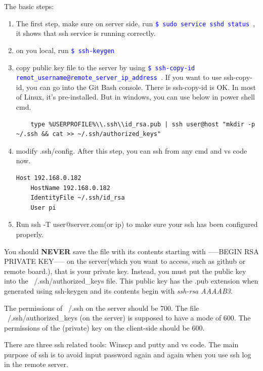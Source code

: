 \documentclass[a4paper,11pt,twoside]{book}
\newcommand{\linuxcommand}[1]{\texttt{\textcolor{blue}{\$ #1 \Pisymbol{psy}{191}}}}
\begin{document}
	The basic steps:
\begin{enumerate}
	\item The first step, make sure on server side, run \linuxcommand{sudo service sshd status}, it shows that ssh service is running correctly.
	
	\item on you local, run \linuxcommand{ssh-keygen}
	
	\item copy public key file to the server by using \linuxcommand{ssh-copy-id remot\_username@remote\_server\_ip\_address}. If you want to use ssh-copy-id, you can go into the Git Bash console. There is ssh-copy-id is OK. In most of Linux, it's pre-installed. But in windows, you can use below in power shell cmd.
	
\begin{verbatim}
	type %USERPROFILE%\\.ssh\\id_rsa.pub | ssh user@host "mkdir -p ~/.ssh && cat >> ~/.ssh/authorized_keys" 
\end{verbatim}

	\item modify .ssh/config. After this step, you can ssh from any cmd and vs code now.
\begin{verbatim}
Host 192.168.0.182
	HostName 192.168.0.182
	IdentityFile ~/.ssh/id_rsa
	User pi
\end{verbatim}

	\item Run ssh -T user@server.com(or ip) to make sure your ssh has been configured properly.
\end{enumerate} 
	 
	You should \textbf{NEVER} save the file with its contents starting with -----BEGIN RSA PRIVATE KEY----- on the server(which you want to access, such as github or remote board.), that is your private key. Instead, you must put the public key into the ~/.ssh/authorized\_keys file. This public key has the .pub extension when generated using ssh-keygen and its contents begin with \textit{ssh-rsa AAAAB3}.
	
	The permissions of ~/.ssh on the server should be 700. The file ~/.ssh/authorized\_keys (on the server) is supposed to have a mode of 600. The permissions of the (private) key on the client-side should be 600.
	
	There are three ssh related tools: Winscp and putty and vs code. The main purpose of ssh is to avoid input password again and again when you use ssh log in the remote server. 
	
\end{document}
